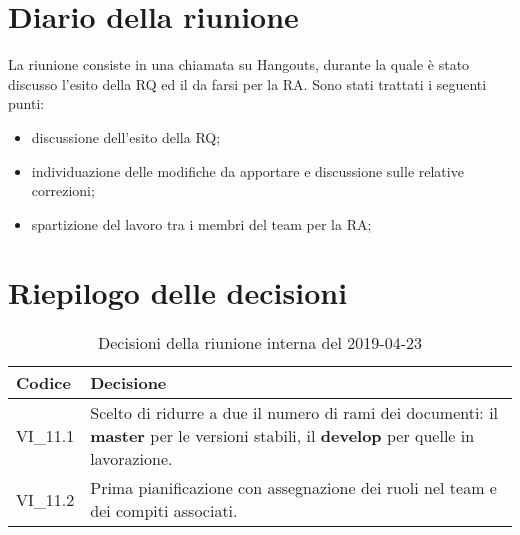 \section{Diario della riunione}
La riunione consiste in una chiamata su Hangouts, durante la quale è stato 
discusso l'esito della RQ ed il da farsi per la RA.
Sono stati trattati i seguenti punti:
\begin{itemize}
	\item discussione dell'esito della RQ;
	\item individuazione delle modifiche da apportare e discussione sulle relative correzioni;
	\item spartizione del lavoro tra i membri del team per la RA;
	
\end{itemize}

\hspace{3cm}

\section{Riepilogo delle decisioni}

	
	\begin{longtable}{ >{\centering}p{} >{}p{}}
		\caption{Decisioni della riunione interna del 2019-04-23}\\	
		\rowcolorhead
		\textbf{\color{white}Codice} 
		& \centering\textbf{\color{white}Decisione} 
		\tabularnewline 
		\endfirsthead
		VI\_11.1 & Scelto di ridurre a due il numero di rami dei documenti: il \textbf{master} per le versioni stabili, il \textbf{develop} per quelle in lavorazione.
		\tabularnewline 
		VI\_11.2 & Prima pianificazione con assegnazione dei ruoli nel team e dei compiti associati.
		
	\end{longtable}
	




